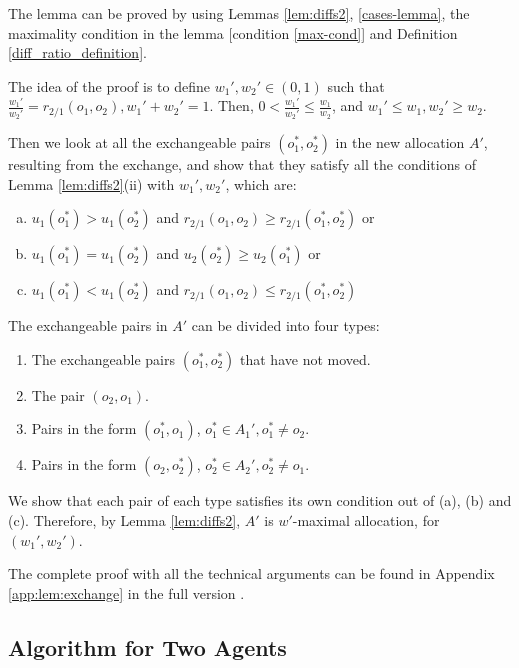 \documentclass[sigconf]{aamas}
\theoremstyle{definition}
\begin{document}
\begin{proofsketch}
The lemma can be proved by using Lemmas \ref{lem:diffs2}, \ref{cases-lemma}, the maximality condition in the lemma [condition \ref{max-cond}] and Definition \ref{diff_ratio_definition}.

The idea of the proof is to define $w_1',w_2'\in (0,1)$ such that $\frac{w_1'}{w_2'} = r_{2/1}(o_1,o_2), w_1'+w_2'=1$. Then, $0 < \frac{w_1'}{w_2'} \leq \frac{w_1}{w_2}$, and $w_1'\leq w_1, w_2'\geq w_2$.

Then we look at all the exchangeable pairs $(o_1^*,o_2^*)$ in the new allocation $A'$, resulting from the exchange, and show that they satisfy all the conditions of Lemma \ref{lem:diffs2}(ii) with $w_1',w_2'$, which are:
\begin{enumerate}[(a)] %
\item $u_1(o_1^*) > u_1(o_2^*)$ and 
    $r_{2/1}(o_1,o_2) \geq r_{2/1}(o_1^*,o_2^*)$ or
\item $u_1(o_1^*) = u_1(o_2^*)$ and
    $u_2(o_2^*)\geq u_2(o_1^*)$ or
\item $u_1(o_1^*) < u_1(o_2^*)$ and
    $r_{2/1}(o_1,o_2) \leq r_{2/1}(o_1^*,o_2^*)$
\end{enumerate}

The exchangeable pairs in $A'$ can be divided into four types:
\begin{enumerate}
    \item The exchangeable pairs $(o_1^*,o_2^*)$ that have not moved. 
    \item The pair $(o_2,o_1)$.
    \item Pairs in the form $(o_1^*,o_1)$, $o_1^*\in A_1', o_1^* \neq o_2$.
    \item Pairs in the form $(o_2,o_2^*)$, $o_2^*\in A_2', o_2^* \neq o_1$.
\end{enumerate}

We show that each pair of each type satisfies its own condition out of (a), (b) and (c).
Therefore, by Lemma \ref{lem:diffs2}, $A'$ is $w'$-maximal allocation, for $(w_1',w_2')$.

The complete proof with all the technical arguments can be found in Appendix \ref{app:lem:exchange} in the full version \citep{shoshan2022efficient}.
\end{proofsketch}

\subsection{Algorithm for Two Agents}
\end{document}
